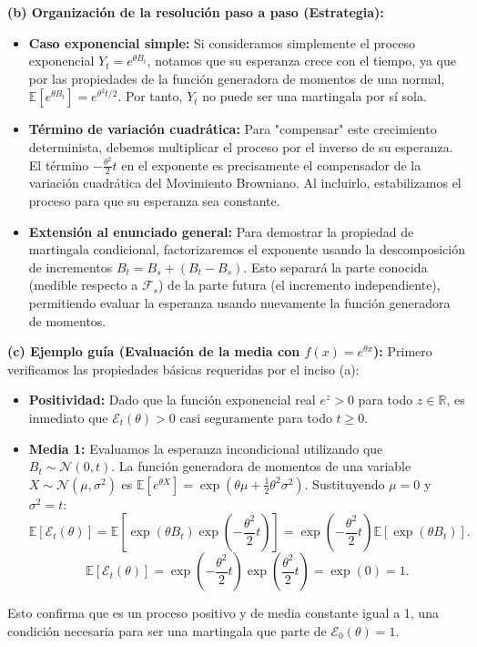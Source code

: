 \documentclass[11pt, letterpaper]{article}
\begin{document}
\begin{solucion}
    \textbf{(b) Organización de la resolución paso a paso (Estrategia):}
    \begin{itemize}
        \item[(i)] \textbf{Caso exponencial simple:} Si consideramos simplemente el proceso exponencial $Y_t = e^{\theta B_t}$, notamos que su esperanza crece con el tiempo, ya que por las propiedades de la función generadora de momentos de una normal, $\mathbb{E}[e^{\theta B_t}] = e^{\theta^2 t / 2}$. Por tanto, $Y_t$ no puede ser una martingala por sí sola.
        \item[(ii)] \textbf{Término de variación cuadrática:} Para "compensar" este crecimiento determinista, debemos multiplicar el proceso por el inverso de su esperanza. El término $-\frac{\theta^2}{2}t$ en el exponente es precisamente el compensador de la variación cuadrática del Movimiento Browniano. Al incluirlo, estabilizamos el proceso para que su esperanza sea constante.
        \item[(iii)] \textbf{Extensión al enunciado general:} Para demostrar la propiedad de martingala condicional, factorizaremos el exponente usando la descomposición de incrementos $B_t = B_s + (B_t - B_s)$. Esto separará la parte conocida (medible respecto a $\mathcal{F}_s$) de la parte futura (el incremento independiente), permitiendo evaluar la esperanza usando nuevamente la función generadora de momentos.
    \end{itemize}

    \vspace{3mm}
    \textbf{(c) Ejemplo guía (Evaluación de la media con $f(x) = e^{\theta x}$):}
    Primero verificamos las propiedades básicas requeridas por el inciso (a):
    \begin{itemize}
        \item \textbf{Positividad:} Dado que la función exponencial real $e^z > 0$ para todo $z \in \mathbb{R}$, es inmediato que $\mathcal{E}_t(\theta) > 0$ casi seguramente para todo $t \ge 0$.
        \item \textbf{Media 1:} Evaluamos la esperanza incondicional utilizando que $B_t \sim \mathcal{N}(0, t)$. La función generadora de momentos de una variable $X \sim \mathcal{N}(\mu, \sigma^2)$ es $\mathbb{E}[e^{\theta X}] = \exp(\theta\mu + \frac{1}{2}\theta^2\sigma^2)$.
        Sustituyendo $\mu = 0$ y $\sigma^2 = t$:
        \[ \mathbb{E}[\mathcal{E}_t(\theta)] = \mathbb{E}\left[ \exp(\theta B_t) \exp\left(-\frac{\theta^2}{2}t\right) \right] = \exp\left(-\frac{\theta^2}{2}t\right) \mathbb{E}[\exp(\theta B_t)]. \]
        \[ \mathbb{E}[\mathcal{E}_t(\theta)] = \exp\left(-\frac{\theta^2}{2}t\right) \exp\left(\frac{\theta^2}{2}t\right) = \exp(0) = 1. \]
    \end{itemize}
    Esto confirma que es un proceso positivo y de media constante igual a 1, una condición necesaria para ser una martingala que parte de $\mathcal{E}_0(\theta) = 1$.


\end{solucion}
\end{document}
